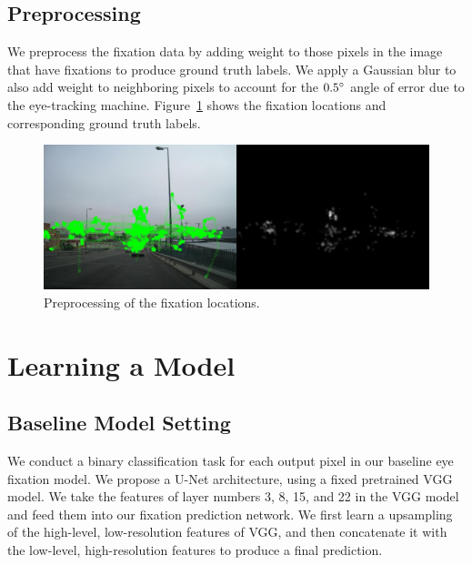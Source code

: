\documentclass[10pt,twocolumn,letterpaper]{article}
\begin{document}
\subsection{Preprocessing} We preprocess the fixation data by adding weight to
those pixels in the image that have fixations to produce ground truth labels.
We apply a Gaussian blur to also add weight to neighboring pixels to account
for the $0.5\degree$ angle of error due to the eye-tracking machine.
Figure~\ref{fig:preprocess} shows the fixation locations and corresponding
ground truth labels.

\begin{figure}
	\begin{center}
		\includegraphics[width=\columnwidth]{figures/preprocess.png}
	\end{center}
	\caption{Preprocessing of the fixation locations.}
	\label{fig:preprocess}
\end{figure}


\section{Learning a Model}
\subsection{Baseline Model Setting}

We conduct a binary classification task for each output pixel in our baseline
eye fixation model. We propose a U-Net architecture, using a fixed pretrained
VGG model. We take the features of layer numbers 3, 8, 15, and 22 in the VGG
model and feed them into our fixation prediction network. We first learn
a upsampling of the high-level, low-resolution features of VGG, and then
concatenate it with the low-level, high-resolution features to produce a final
prediction.
\end{document}
